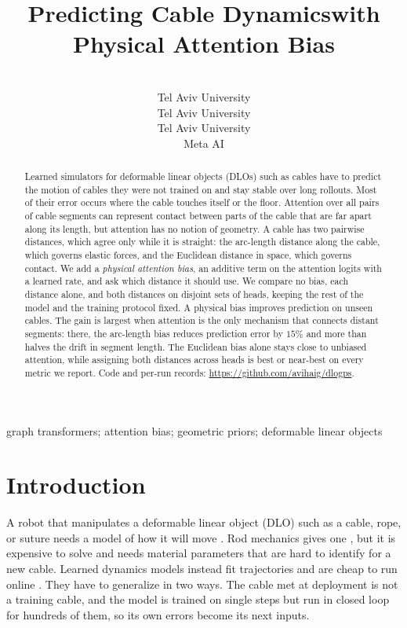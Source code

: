 \documentclass[mlabstract,onecolumn]{jmlr}
\title[Predicting Cable Dynamics with Physical Attention Bias]{Predicting Cable Dynamics\titlebreak with Physical Attention Bias}
\author{\Name{Avihai Giuili\nametag{\thanks{Equal contribution.}}} \Email{avigiuili@mail.tau.ac.il}\\
  \addr Tel Aviv University
  \AND
  \Name{Rotem Atari\nametag{\footnotemark[1]}} \Email{rotematari@mail.tau.ac.il}\\
  \addr Tel Aviv University
  \AND
  \Name{Avishai Sintov} \Email{sintov1@tauex.tau.ac.il}\\
  \addr Tel Aviv University
  \AND
  \Name{Maya Bechler-Speicher} \Email{mayabs@meta.com}\\
  \addr Meta AI}
\begin{document}
\maketitle

\begin{abstract}
Learned simulators for deformable linear objects (DLOs) such as cables have to
predict the motion of cables they were not trained on and stay stable over long
rollouts. Most of their error occurs where the cable touches itself or the
floor. Attention over all pairs of cable segments can represent contact
between parts of the cable that are far apart along its length, but attention
has no notion of geometry. A cable has two pairwise distances, which agree
only while it is straight: the arc-length distance along the cable, which
governs elastic forces, and the Euclidean distance in space, which governs
contact. We add a \emph{physical attention bias}, an additive term on the
attention logits with a learned rate, and ask which distance it should use.
We compare no bias, each distance alone, and both distances on disjoint sets
of heads, keeping the rest of the model and the training protocol fixed. A
physical bias improves prediction on unseen cables. The gain is largest when
attention is the only mechanism that connects distant segments: there, the
arc-length bias reduces prediction error by $15\%$ and more than halves the
drift in segment length. The Euclidean bias alone stays close to unbiased
attention, while assigning both distances across heads is best or near-best on
every metric we report. Code and per-run records: \url{https://github.com/avihaig/dlogps}.
\end{abstract}

\begin{keywords}
graph transformers; attention bias; geometric priors; deformable linear objects
\end{keywords}

\section{Introduction}
\label{sec:intro}

A robot that manipulates a deformable linear object (DLO) such as a cable,
rope, or suture needs a model of how it will move
\citep{caporali2026dlo_survey,yu2025whole_body}. Rod mechanics gives one
\citep{bergou2008der}, but it is expensive to solve and needs material
parameters that are hard to identify for a new cable. Learned dynamics models instead fit trajectories and are cheap to run online
\citep{yang2021inbilstm,gu2025ganet}. They have to generalize in two ways. The cable met at deployment is not a training cable, and the model is
trained on single steps but run in closed loop for hundreds of them, so its
own errors become its next inputs.
\end{document}
